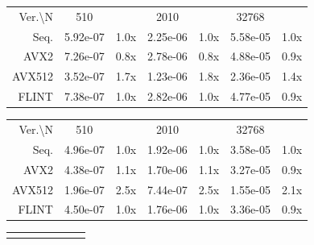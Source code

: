 \documentclass[a4paper]{article}
\begin{document}
\begin{table}[h!]
    \centering
    
    \begin{tabular}{|r|*{3}{c c|}}
        \hline
        \rowcolor{myGray} 
        \multicolumn{7}{|c|}{\textsc{Cascade Lake}} \\

        \hline
        \rowcolor{myGray}
        Ver.\textbackslash N & 510 & & 2010 & & 32768 & \\
        \hline
        \cellcolor{myGray} Seq. & 5.92e-07 & 1.0x & 2.25e-06 & 1.0x & 5.58e-05 & 1.0x \\
        \hline
        \cellcolor{myGray} AVX2 & 7.26e-07 & 0.8x & 2.78e-06 & 0.8x & 4.88e-05 & 0.9x \\
        \hline
        \cellcolor{myGray} AVX512 & 3.52e-07 & 1.7x & 1.23e-06 & 1.8x & 2.36e-05 & 1.4x \\
        \hline
        \cellcolor{myGray} FLINT & 7.38e-07 & 1.0x & 2.82e-06 & 1.0x & 4.77e-05 & 0.9x \\
        \hline
    \end{tabular}

    \begin{tabular}{|r|*{3}{c c|}}
        \hline
        \rowcolor{myGray} 
        \multicolumn{7}{|c|}{\textsc{Ice Lake}} \\

        \hline
        \rowcolor{myGray}
        Ver.\textbackslash N & 510 & & 2010 & & 32768 & \\
        \hline
        \cellcolor{myGray} Seq. & 4.96e-07 & 1.0x & 1.92e-06 & 1.0x & 3.58e-05 & 1.0x \\
        \hline
        \cellcolor{myGray} AVX2 & 4.38e-07 & 1.1x & 1.70e-06 & 1.1x & 3.27e-05 & 0.9x \\
        \hline
        \cellcolor{myGray} AVX512 & 1.96e-07 & 2.5x & 7.44e-07 & 2.5x & 1.55e-05 & 2.1x \\
        \hline
        \cellcolor{myGray} FLINT & 4.50e-07 & 1.0x & 1.76e-06 & 1.0x & 3.36e-05 & 0.9x \\
        \hline
    \end{tabular}

    \begin{tabular}{|r|*{3}{c c|}}
        \hline
        \rowcolor{myGray}
        \multicolumn{7}{|c|}{\textsc{Zen 4}} \\


\end{tabular}
\end{table}
\end{document}
